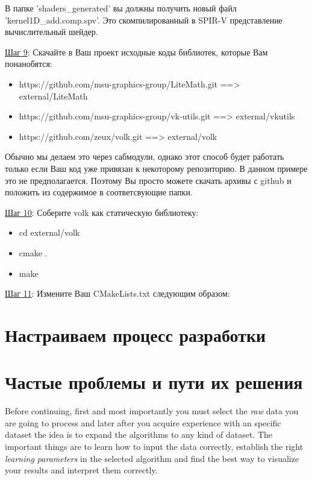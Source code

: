 \documentclass[11pt,fleqn,english,russian]{report} %
\begin{document}
В папке 'shaders\_generated' вы должны получить новый файл 'kernel1D\_add.comp.spv'. Это скомпилированный в SPIR-V представление вычислительный шейдер.

\vspace*{5px}
\underline{Шаг 9}: Скачайте в Ваш проект исходные коды библиотек, которые Вам понанобятся:

\begin{itemize}
	\item https://github.com/msu-graphics-group/LiteMath.git ==> external/LiteMath
	\item https://github.com/msu-graphics-group/vk-utils.git ==> external/vkutils
	\item https://github.com/zeux/volk.git                   ==> external/volk
\end{itemize}

Обычно мы делаем это через сабмодули, однако этот способ будет работать только если Ваш код уже привязан к некоторому репозиторию. В данном примере это не предполагается. Поэтому Вы просто можете скачать архивы с github и положить из содержимое в соответсвующие папки.

\vspace*{5px}
\underline{Шаг 10}: Соберите volk как статическую библиотеку:

\begin{itemize}
	\item cd external/volk
	\item cmake .
	\item make
\end{itemize}

\underline{Шаг 11}: Измените Ваш CMakeLists.txt следующим образом:

\chapter{Настраиваем процесс разработки}


\chapter{Частые проблемы и пути их решения}

Before continuing, first and most importantly you must select the \emph{raw} data you are going to process and later after you acquire experience with an specific dataset the idea is to expand the algorithms to any kind of dataset. The important things are to learn how to input the data correctly, establish the right \emph{learning parameters} in the selected algorithm and find the best way to visualize your results and interpret them correctly.
\end{document}
